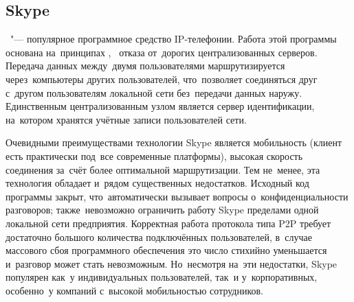 \subsection{Skype}

~"--- популярное программное средство IP-телефонии.
Работа этой программы основана на~принципах , \ie~отказа от~дорогих централизованных серверов.
Передача данных между~двумя пользователями маршрутизируется через~компьютеры других пользователей, что~позволяет соединяться друг с~другом пользователям локальной сети без~передачи данных наружу.
Единственным централизованным узлом является сервер идентификации, на~котором хранятся учётные записи пользователей сети.

Очевидными преимуществами технологии Skype является мобильность (клиент есть практически под~все современные платформы), высокая скорость соединения за~счёт более оптимальной маршрутизации.
Тем не~менее, эта технология обладает и~рядом существенных недостатков.
Исходный код программы закрыт, что~автоматически вызывает вопросы о~конфиденциальности разговоров; также~невозможно ограничить работу Skype пределами одной локальной сети предприятия.
Корректная работа протокола типа P2P требует достаточно большого количества подключённых пользователей, в~случае массового сбоя программного обеспечения это число стихийно уменьшается и~разговор может стать невозможным.
Но~несмотря на~эти недостатки, Skype популярен как~у индивидуальных пользователей, так~и у~корпоративных, особенно~у компаний с~высокой мобильностью сотрудников.